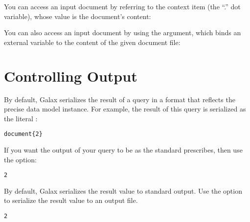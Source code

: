 You can access an input document by referring to the context item (the
``.'' dot variable), whose value is the document's content:
\begin{alltt}
% echo '.' >dot.xq
% galax-run -context-item docs/books.xml dot.xq
\end{alltt}

You can also access an input document by using the 
argument, which binds an external variable to the content of the given
document file:
\begin{alltt}
% echo 'declare variable $x external; $x' > var.xq
% galax-run -doc x=docs/books.xml var.xq
\end{alltt}

\section{Controlling Output}

By default, Galax serializes the result of a query in a format that
reflects the precise data model instance. For example, the result of
this query is serialized as the literal :
\begin{alltt}
% echo "document \{ 1+1 \}"> docnode.xq
% galax-run docnode.xq
document \{ 2 \}
\end{alltt}

If you want the output of your query to be as the standard prescribes, 
then use the  option:
\begin{alltt}
% galax-run docnode.xq -serialize standard
2
\end{alltt}


By default, Galax serializes the result value to standard output.  Use
the  option to serialize the result value to an output
file.
\begin{alltt}
% galax-run docnode.xq -serialize standard -output-xml output.xml
% cat output.xml
2
\end{alltt}

